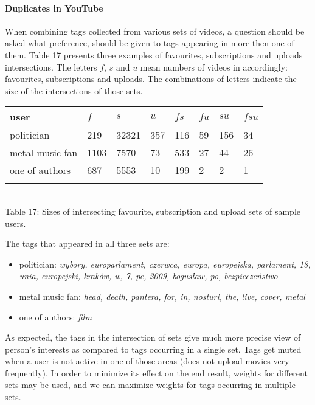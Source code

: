 \paragraph{Duplicates in YouTube}

When combining tags collected from various sets of videos, a question should be
asked what preference, should be given to tags appearing in more
then one of them. Table 17 presents three examples of favourites,
subscriptions and uploads intersections. The letters $f$, $s$ and $u$ mean
numbers of videos in accordingly: favourites, subscriptions and uploads. The
combinations of letters indicate the size of the intersections of those sets. \\

\begin{center}
\begin{tabular}{| l | l | l | l | l | l | l | l |}
user & $f$ & $s$ & $u$ & $fs$ & $fu$ & $su$ & $fsu$ \\ \hline
politician & 219 & 32321 & 357 & 116 & 59 & 156 & 34 \\
metal music fan & 1103 & 7570 & 73 & 533 & 27 & 44 & 26 \\
one of authors & 687 & 5553 & 10 & 199 & 2 & 2 & 1 \\
\label{intersections}
\end{tabular} \\
Table 17: Sizes of intersecting favourite, subscription and upload sets of sample users. \\
\end{center}

The tags that appeared in all three sets are:
\begin{itemize}
  \item{politician: \emph{wybory, europarlament, czerwca, europa, europejska,
  parlament, 18, unia, europejski, kraków, w, 7, pe, 2009, bogusław, po,
  bezpieczeństwo}}
  \item{metal music fan: \emph{head, death, pantera, for, in, nosturi, the, live, cover, metal}}
  \item{one of authors: \emph{film}}
\end{itemize}

As expected, the tags in the intersection of sets give much more precise view of person's
interests as compared to tags occurring in a single set. Tags get muted when a user is not active in one of
those areas (\eg does not upload movies very frequently). In order to minimize its effect on the
end result, weights for different sets may be used, and we can maximize weights for tags occurring
in multiple sets.


